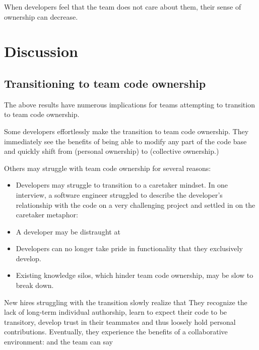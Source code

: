 When developers feel that the team does not care about them, their sense of ownership can decrease.

\section{Discussion}
\label{Discussion}
\subsection{Transitioning to team code ownership}
\label{Transitioning}

The above results have numerous implications for teams attempting to transition to team code ownership. 

Some developers effortlessly make the transition to team code ownership. They immediately see the benefits of being able to modify any part of the code base and quickly shift from  (personal ownership) to  (collective ownership.)

Others may struggle with team code ownership for several reasons:

\begin{itemize}  

\item Developers may struggle to transition to a caretaker mindset.  In one interview, a software engineer struggled to describe the developer's relationship with the code on a very challenging project and settled in on the caretaker metaphor:  

\item A developer may be distraught at  

\item Developers can no longer take pride in functionality that they exclusively develop.

\item Existing knowledge silos, which hinder team code ownership, may be slow to break down.
 
\end{itemize}

New hires struggling with the transition slowly realize that  They recognize the lack of long-term individual authorship, learn to expect their code to be transitory, develop trust in their teammates and thus loosely hold personal contributions.  Eventually,  they experience the benefits of a collaborative environment:  and the team can say 

